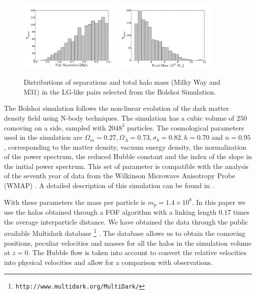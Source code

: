 \documentclass{emulateapj}
\newcommand{\hMpc}{{\ifmmode{h^{-1}{\rm Mpc}}\else{$h^{-1}$Mpc }\fi}}
\newcommand{\hMsun}{{\ifmmode{h^{-1}{\rm {M_{\odot}}}}\else{$h^{-1}{\rm{M_{\odot}}}$}\fi}}
\begin{document}
\label{subsec:lg-sample}
\begin{figure}
\begin{center}
\includegraphics[keepaspectratio=true,width=0.45\textwidth]{./figures/separation.pdf}
\includegraphics[keepaspectratio=true,width=0.45\textwidth]{./figures/total_mass.pdf}
\caption{\label{fig:distros} Distributions of separations and total halo mass (Milky Way and M31) in the LG-like pairs selected from the Bolshoi Simulation.}
\end{center}
\end{figure}


The Bolshoi simulation follows the non-linear evolution of the dark matter density field using N-body techniques. The simulation has a cubic volume of $250$\hMpc comoving on a side, sampled with $2048^{3}$ particles. The cosmological parameters used in the simulation are $\Omega_{m}=0.27, \Omega_{\Lambda}=0.73, \sigma_{8}=0.82, h=0.70$ and $n=0.95$, corresponding to the matter density, vacuum energy density, the normalization of the power spectrum, the reduced Hubble constant and the index of the slope in the initial power spectrum. This set of parameter is compatible with the analysis  of the seventh year of data from the Wilkinson Microwave Anisotropy Probe (WMAP) \citep{Jarosik2011}. A detailed description of this simulation can be found in \citep{Bolshoi}.

With these parameters the mass per particle is $m_{p}=1.4\times 10^{8}$\hMsun. In this paper we use the halos obtained through a FOF algorithm with a linking length $0.17$ times the average interparticle distance. We have obtained the data through the public available Multidark database \footnote{{\tt http://www.multidark.org/MultiDark/}} \citep{2011arXiv1109.0003R}. The database allows us to obtain the comoving positions, peculiar velocities and masses for all the halos in the simulation volume at $z=0$. The Hubble flow is taken into account to convert the relative velocities into physical velocities and allow for a comparison with observations.
\end{document}

